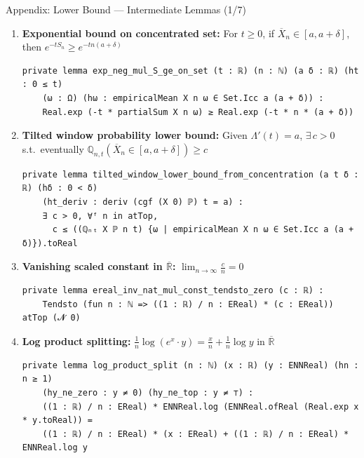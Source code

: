 \documentclass[aspectratio=169]{beamer}
\newcommand{\Q}{\mathbb{Q}}
\newcommand{\R}{\mathbb{R}}
\begin{document}
\begin{frame}[fragile]{Appendix: Lower Bound --- Intermediate Lemmas (1/7)}
  \begin{enumerate}
    \item \textbf{Exponential bound on concentrated set:} For $t \ge 0$, if $\overline{X}_n \in [a, a+\delta]$, then $e^{-tS_n} \ge e^{-tn(a+\delta)}$
\begin{lstlisting}[basicstyle=\ttfamily\tiny]
private lemma exp_neg_mul_S_ge_on_set (t : ℝ) (n : ℕ) (a δ : ℝ) (ht : 0 ≤ t)
    (ω : Ω) (hω : empiricalMean X n ω ∈ Set.Icc a (a + δ)) :
    Real.exp (-t * partialSum X n ω) ≥ Real.exp (-t * n * (a + δ))
\end{lstlisting}
    \item \textbf{Tilted window probability lower bound:} Given $\Lambda'(t) = a$, $\exists\, c > 0$ s.t.\ eventually $\Q_{n,t}(\overline{X}_n \in [a, a+\delta]) \ge c$
\begin{lstlisting}[basicstyle=\ttfamily\tiny]
private lemma tilted_window_lower_bound_from_concentration (a t δ : ℝ) (hδ : 0 < δ)
    (ht_deriv : deriv (cgf (X 0) ℙ) t = a) :
    ∃ c > 0, ∀ᶠ n in atTop,
      c ≤ ((ℚₙₜ X ℙ n t) {ω | empiricalMean X n ω ∈ Set.Icc a (a + δ)}).toReal
\end{lstlisting}
    \item \textbf{Vanishing scaled constant in $\overline{\R}$:} $\lim_{n\to\infty} \frac{c}{n} = 0$
\begin{lstlisting}[basicstyle=\ttfamily\tiny]
private lemma ereal_inv_nat_mul_const_tendsto_zero (c : ℝ) :
    Tendsto (fun n : ℕ => ((1 : ℝ) / n : EReal) * (c : EReal)) atTop (𝓝 0)
\end{lstlisting}
    \item \textbf{Log product splitting:} $\frac{1}{n}\log(e^x \cdot y) = \frac{x}{n} + \frac{1}{n}\log y$ in $\overline{\R}$
\begin{lstlisting}[basicstyle=\ttfamily\tiny]
private lemma log_product_split (n : ℕ) (x : ℝ) (y : ENNReal) (hn : n ≥ 1)
    (hy_ne_zero : y ≠ 0) (hy_ne_top : y ≠ ⊤) :
    ((1 : ℝ) / n : EReal) * ENNReal.log (ENNReal.ofReal (Real.exp x * y.toReal)) =
    ((1 : ℝ) / n : EReal) * (x : EReal) + ((1 : ℝ) / n : EReal) * ENNReal.log y
\end{lstlisting}
  \end{enumerate}
\end{frame}
\end{document}
